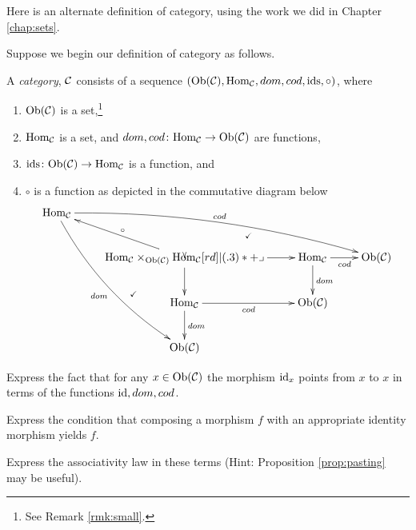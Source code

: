 \documentclass[CT4S-EN-RU]{subfiles}
\begin{document}
Here is an alternate definition of category, using the work we did in Chapter \ref{chap:sets}.

\begin{exercise}\label{exc:cat in set}

Suppose we begin our definition of category as follows. 

A {\em category}, $\mathcal{C}$ consists of a sequence $(\textnormal{Ob}(\mathcal{C}),\textnormal{Hom}_\mathcal{C},dom,cod,\textnormal{ids},\circ)$, where 
\begin{enumerate}
\item $\textnormal{Ob}(\mathcal{C})$ is a set,\footnote{See Remark \ref{rmk:small}.}
\item $\textnormal{Hom}_\mathcal{C}$ is a set, and $dom,cod\colon\textnormal{Hom}_\mathcal{C}\rightarrow\textnormal{Ob}(\mathcal{C})$ are functions, 
\item $\textnormal{ids}\colon\textnormal{Ob}(\mathcal{C})\rightarrow\textnormal{Hom}_\mathcal{C}$ is a function, and 
\item $\circ$ is a function as depicted in the commutative diagram below
\begin{align}\label{dia:pullback version of cat}
\xymatrix{
\Hom_\mcC\ar@/^1pc/[drrr]^{cod}\ar@/_1pc/[dddr]_{dom}&&\\
&\Hom_\mcC\times_{\Ob(\mcC)}\Hom_\mcC\ar@{}[ur]|{\checkmark}\ar@{}[ddl]|(.4){\checkmark}\ar[ul]_\circ\ar[r]\ar[d]\ullimit&\Hom_\mcC\ar[r]_{cod}\ar[d]^{dom}&\Ob(\mcC)\\
&\Hom_\mcC\ar[r]_{cod}\ar[d]^{dom}&\Ob(\mcC)\\
&\Ob(\mcC)
}
\end{align}
\end{enumerate}

\sexc Express the fact that for any $x\in\textnormal{Ob}(\mathcal{C})$ the morphism $\textnormal{id}_x$ points from $x$ to $x$ in terms of the functions $\textnormal{id},dom,cod$. 
\item Express the condition that composing a morphism $f$ with an appropriate identity morphism yields $f$.
\item Express the associativity law in these terms (Hint: Proposition \ref{prop:pasting} may be useful).
\endsexc
\end{exercise}
\end{document}
